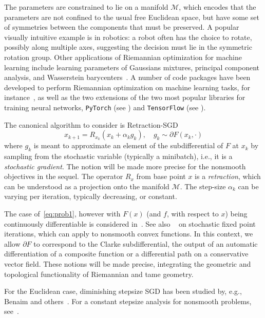 \documentclass{article}
\begin{document}
The parameters are constrained to lie on a manifold $\mathcal{M}$, which encodes that the parameters are not confined to the usual free Euclidean space, but have some set of symmetries between the components that must be preserved. A popular visually intuitive example is in robotics: a robot often has the choice to rotate, possibly along multiple axes, suggesting the decision must lie in the symmetric rotation group. Other applications of Riemannian optimization for machine learning include
learning parameters of Gaussians mixtures, principal component analysis, and Wasserstein barycenters~\cite{hosseini2020recent}. A number of code packages have been developed to perform Riemannian optimization on machine learning tasks, for instance~\cite{miolane2020geomstats}, as well as the two extensions of the two most popular libraries for training neural networks, \texttt{PyTorch} (see \cite{kochurov2020geoopt}) and \texttt{TensorFlow} (see \cite{smirnov2021tensorflow}).

The canonical algorithm to consider is Retraction-SGD
\begin{equation}\label{eq:retsgd}
x_{k+1}=R_{x_k}(x_k+\alpha_k g_k),\quad g_k\sim \partial F(x_k,\cdot)
\end{equation}
where $g_k$ is meant to approximate an element of the subdifferential of $F$ at $x_k$ by sampling from the stochastic variable (typically a minibatch), i.e., it is a \emph{stochastic gradient}. The notion will be made more precise for the nonsmooth objectives in the sequel. The operator $R_{x}$ from base point $x$ is a \emph{retraction}, which can be understood as a projection onto the manifold $\mathcal{M}$. The step-size $\alpha_k$ can be varying per iteration, typically decreasing, or constant. 

The case of~\eqref{eq:prob1}, however with $F(x)$ (and $f$, with respect to $x$) being continuously differentiable is considered in~\cite{durmus2020convergence,durmus2021riemannian,shah2021stochastic}. See also ~\cite{iiduka2022riemannian} on stochastic fixed point iterations, which can apply to nonsmooth convex functions. In this context, we allow $\partial F$ to correspond to the Clarke subdifferential, the output of an automatic differentiation of a composite function or a differential path on a conservative vector field. These notions will be made precise, integrating the geometric and topological functionality of Riemannian and tame geometry.


For the Euclidean case, diminishing stepsize SGD has been studied by, e.g., Benaim and others~\cite{benaim2005stochastic,majewski2018analysis}. For a constant stepsize analysis for nonsmooth problems, see~\cite{bianchi2022convergence}.
\end{document}
